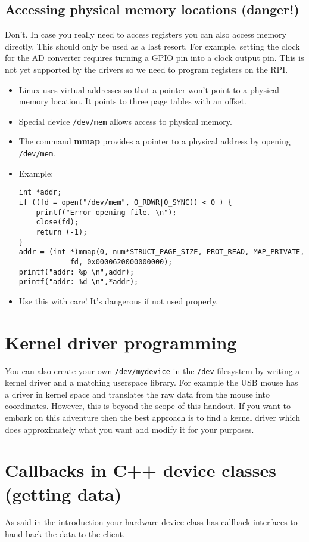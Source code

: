 \documentclass[12pt]{report}
\begin{document}
\subsection{Accessing physical memory locations (danger!)}

Don't.
In case you really need to access registers you can
also access memory directly. This should only be used as a last resort.
For example, setting the clock for the AD converter requires
turning a GPIO pin into a clock output pin. This is not yet
supported by the drivers so we need to program registers
on the RPI.
\begin{itemize}
\item Linux uses virtual addresses so that a pointer won't
point to a physical memory location. It points to three page
tables with an offset.
\item Special device \texttt{/dev/mem} allows access to physical
memory.
\item The command \textbf{mmap} provides a pointer to a physical
address by opening \texttt{/dev/mem}.
\item Example:
\begin{verbatim}
int *addr;
if ((fd = open("/dev/mem", O_RDWR|O_SYNC)) < 0 ) {
    printf("Error opening file. \n");
    close(fd);
    return (-1);
}
addr = (int *)mmap(0, num*STRUCT_PAGE_SIZE, PROT_READ, MAP_PRIVATE,
            fd, 0x0000620000000000);
printf("addr: %p \n",addr);
printf("addr: %d \n",*addr);
\end{verbatim}
\item Use this with care! It's dangerous if not used properly.
\end{itemize}


\section{Kernel driver programming}
You can also create your own \texttt{/dev/mydevice} in the \texttt{/dev} filesystem
by writing a kernel driver and a matching userspace library. For
example the USB mouse has a driver in kernel space and translates
the raw data from the mouse into coordinates. However,
this is beyond the scope of this handout. If you want to embark
on this adventure then the best approach is to
find a kernel driver which does approximately what you want and
modify it for your purposes.


\section{Callbacks in C++ device classes (getting data)}
As said in the introduction your hardware device class has callback interfaces
to hand back the data to the client.
\end{document}
